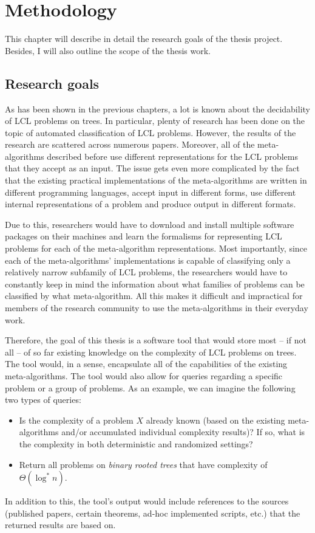 
\chapter{Methodology}
\label{chapter:methods}

This chapter will describe in detail the research goals of the thesis project. Besides, I will also outline the scope of the thesis work.

\section{Research goals}

As has been shown in the previous chapters, a lot is known about the decidability
of LCL problems on trees. In particular, plenty of research has been done
on the topic of automated classification of LCL problems. However, the
results of the research are scattered across numerous papers. Moreover,
all of the meta-algorithms described before use different representations for
the LCL problems that they accept as an input.
The issue gets even more complicated by the fact that the existing practical implementations
of the meta-algorithms are written in different programming languages, accept input in
different forms,
use different internal representations of a problem and produce output in different
formats.

Due to this, researchers would
have to download and install multiple software packages on their machines and learn
the formalisms for representing LCL problems for each of the meta-algorithm
representations. Most importantly, since each of the meta-algorithms' implementations
is capable of classifying only a relatively narrow subfamily of LCL problems, the
researchers would have to constantly keep in mind the information about what families
of problems can be classified by what meta-algorithm.
All this makes it difficult and impractical for members of
the research community
to use the meta-algorithms in their everyday work.

Therefore, the goal of this thesis is a software tool that would store most -- if not all -- of
so far existing knowledge on the complexity of LCL problems on trees.
The tool would, in a sense, encapsulate all of the capabilities
of the existing meta-algorithms.
The tool would also allow for queries regarding a specific problem or a group of
problems. As an example, we can imagine the following two types of queries:
\begin{itemize}
  \item Is the complexity of a problem $X$ already known (based on the existing meta-algorithms
  and/or accumulated individual complexity results)? If so, what is the complexity in both
  deterministic and randomized settings?
  \item Return all problems on \emph{binary rooted trees} that have complexity of
  $\Theta(\log^* n)$.
\end{itemize}
In addition to this, the tool’s output would include references to
the sources
(published papers, certain theorems, ad-hoc implemented scripts, etc.)
that the returned results are based on.

